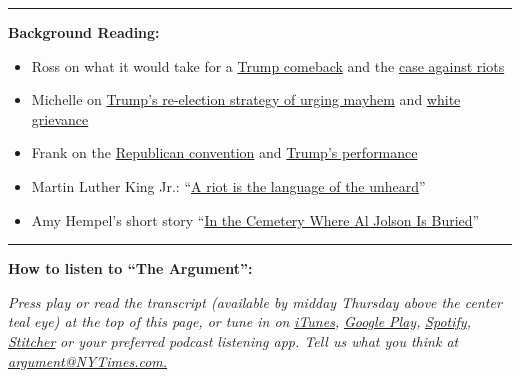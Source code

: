 \begin{center}\rule{0.5\linewidth}{\linethickness}\end{center}

\textbf{Background Reading:}

\begin{itemize}
\item
  Ross on what it would take for a
  \href{https://www.nytimes3xbfgragh.onion/2020/07/21/opinion/trump-polls-election-2020.html}{Trump
  comeback} and the
  \href{https://www.nytimes3xbfgragh.onion/2020/05/30/opinion/sunday/riots-george-floyd.html}{case
  against riots}
\item
  Michelle on
  \href{https://www.nytimes3xbfgragh.onion/2020/08/31/opinion/trump-biden-violence.html}{Trump's
  re-election strategy of urging mayhem} and
  \href{https://www.nytimes3xbfgragh.onion/2020/07/02/opinion/trump-racism-2020-election.html}{white
  grievance}
\item
  Frank on the
  \href{https://www.nytimes3xbfgragh.onion/2020/08/26/opinion/trump-melania-rnc.html}{Republican
  convention} and
  \href{https://www.nytimes3xbfgragh.onion/2020/08/28/opinion/sunday/trump-rnc-speech.html}{Trump's
  performance}
\item
  Martin Luther King Jr.:
  ``\href{https://www.cbsnews.com/news/mlk-a-riot-is-the-language-of-the-unheard/}{A
  riot is the language of the unheard}''
\item
  Amy Hempel's short story
  ``\href{http://fictionaut.com/stories/amy-hempel/in-the-cemetery-where-al-jolson-is-buried.pdf}{In
  the Cemetery Where Al Jolson Is Buried}''
\end{itemize}

\begin{center}\rule{0.5\linewidth}{\linethickness}\end{center}

\textbf{How to listen to ``The Argument'':}

\emph{Press play or read the transcript (available by midday Thursday
above the center teal eye) at the top of this page, or tune in on}
\href{https://itunes.apple.com/us/podcast/the-argument/id1438024613?mt=2}{\emph{iTunes}}\emph{,}
\href{https://play.google.com/music/listen?u=0\#/ps/Idxib4hsg3yviao4gtym76knjjy}{\emph{Google
Play}}\emph{,}
\href{https://open.spotify.com/episode/5fIsHqqunLBwoxPSUUSGre?si=Rz5D9VnlRFKdGMu8ixzBOw}{\emph{Spotify}}\emph{,}
\href{https://www.stitcher.com/podcast/the-new-york-times/the-argument}{\emph{Stitcher}}
\emph{or your preferred podcast listening app. Tell us what you think
at} \href{mailto:argument@NYTimes.com}{\emph{argument@NYTimes.com.}}

